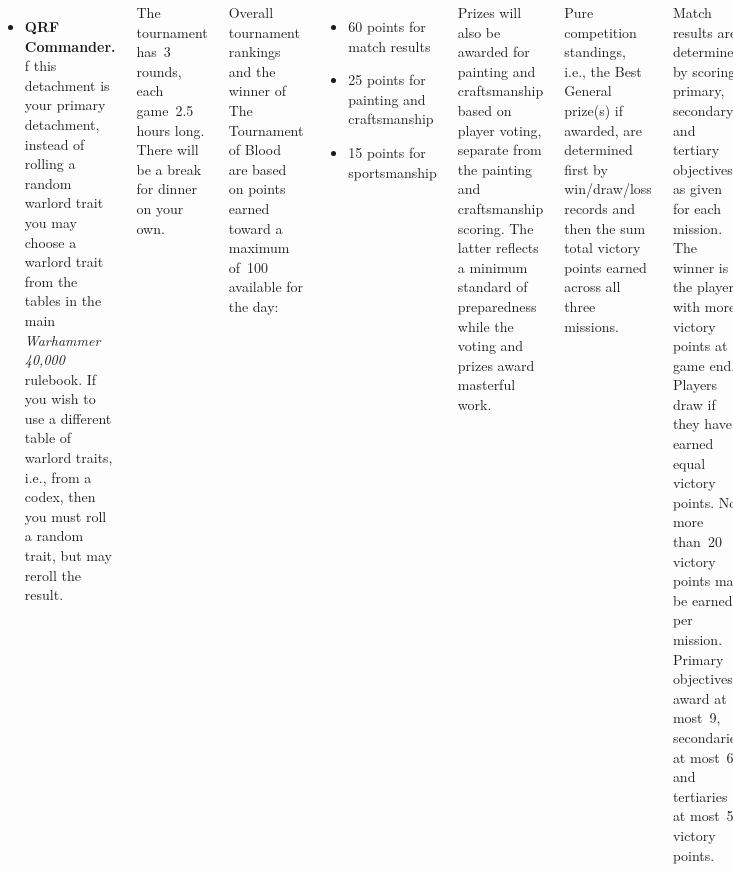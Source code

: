 \documentclass{40k}
\begin{document}
\begin{columns}
\begin{itemize}
\item \textbf{QRF Commander.} f this detachment is your primary
  detachment, instead of rolling a random warlord trait you may choose
  a warlord trait from the tables in the main \emph{Warhammer 40,000}
  rulebook. If you wish to use a different table of warlord traits,
  i.e., from a codex, then you must roll a random trait, but may
  reroll the result.
\end{itemize}


The tournament has~3 rounds, each game~2.5 hours long.  There will be
a break for dinner on your own.


Overall tournament rankings and the winner of The Tournament of Blood
are based on points earned toward a maximum of~100 available for the
day:
\begin{itemize}\shortlist
\item 60 points for match results
\item 25 points for painting and craftsmanship
\item 15 points for sportsmanship
\end{itemize}

Prizes will also be awarded for painting and craftsmanship based on
player voting, separate from the painting and craftsmanship scoring.
The latter reflects a minimum standard of preparedness while the
voting and prizes award masterful work.

Pure competition standings, i.e., the Best General prize(s) if
awarded, are determined first by win/draw/loss records and then the
sum total victory points earned across all three missions.





Match results are determined by scoring primary, secondary, and
tertiary objectives as given for each mission.  The winner is the
player with more victory points at game end.  Players draw if they
have earned equal victory points.  No more than~20 victory points may
be earned per mission.  Primary objectives award at most~9,
secondaries at most~6, and tertiaries at most~5 victory points.

Match results are a simple sum of the victory points earned in each
mission, up to 20 points each.


\end{columns}
\end{document}
